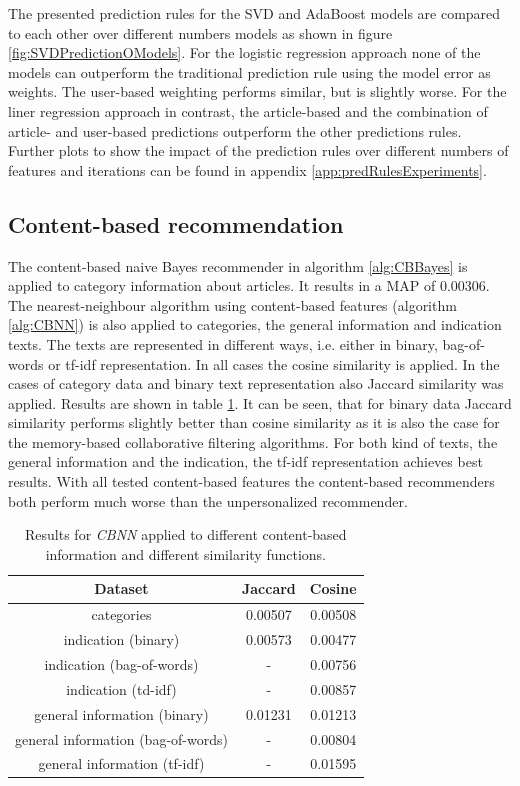 \documentclass[10pt]{reportMaster}
\begin{document}
The presented prediction rules for the SVD and AdaBoost models are compared to each other over different numbers models as shown in figure \ref{fig:SVDPredictionOModels}. %
For the logistic regression approach none of the models can outperform the traditional prediction rule using the model error as weights.
The user-based weighting performs similar, but is slightly worse.
For the liner regression approach in contrast, the article-based and the combination of article- and user-based predictions outperform the other predictions rules.
Further plots to show the impact of the prediction rules over different numbers of features and iterations can be found in appendix \ref{app:predRulesExperiments}.

\subsection{Content-based recommendation}
The content-based naive Bayes recommender in algorithm \ref{alg:CBBayes} is applied to category information about articles.
It results in a MAP of 0.00306.
The nearest-neighbour algorithm using content-based features (algorithm \ref{alg:CBNN}) is also applied to categories, the general information and indication texts.
The texts are represented in different ways, i.e. either in binary, bag-of-words or tf-idf representation.
In all cases the cosine similarity is applied.
In the cases of category data and binary text representation also Jaccard similarity was applied. 
Results are shown in table \ref{tab:CBNN}.
It can be seen, that for binary data Jaccard similarity performs slightly better than cosine similarity as it is also the case for the memory-based collaborative filtering algorithms.
For both kind of texts, the general information and the indication, the tf-idf representation achieves best results.
With all tested content-based features the content-based recommenders both perform much worse than the unpersonalized recommender.

\begin{table}
\begin{tabular}{|c||c|c|}
	\hline
	\textbf{Dataset}&\textbf{Jaccard}&\textbf{Cosine}\\ \hline
	categories&0.00507&0.00508\\ \hline
	indication (binary)&0.00573&0.00477\\ \hline	
	indication (bag-of-words)&-&0.00756\\ \hline	
	indication (td-idf)&-&0.00857\\ \hline	
	general information (binary)&0.01231&0.01213\\ \hline	
	general information (bag-of-words)&-&0.00804\\ \hline	
	general information (tf-idf)&-&0.01595\\ \hline	
	\end{tabular}
	\caption{Results for \textit{CBNN} applied to different content-based information and different similarity functions.}	
	\label{tab:CBNN}
\end{table}
\end{document}
